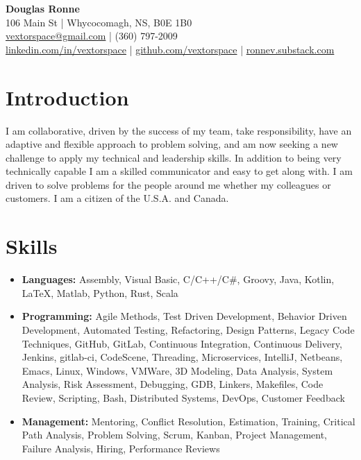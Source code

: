 \documentclass[letter,11pt]{article}
\begin{document}
\begin{center}
    {\Huge \textbf{Douglas Ronne}}\\
    \vspace{2mm}
    106 Main St | Whycocomagh, NS, B0E 1B0\\
    \href{mailto:vextorspace@gmail.com}{vextorspace@gmail.com} | (360) 797-2009\\
    \href{https://www.linkedin.com/in/vextorspace}{linkedin.com/in/vextorspace} | \href{https://github.com/vextorspace}{github.com/vextorspace} | \href{https://ronnev.substack.com}{ronnev.substack.com}
\end{center}

\section*{Introduction}

I am collaborative, driven by the success of my team, take responsibility, have an adaptive and flexible approach to problem solving, and am now seeking a new challenge to apply my technical and leadership skills. In addition to being very technically capable I am a skilled communicator and easy to get along with. I am driven to solve problems for the people around me whether my colleagues or customers. I am a citizen of the U.S.A. and Canada.

\section*{Skills}
\begin{itemize}[leftmargin=*,itemsep=0pt, parsep=0pt,label=$\diamond$]
\item \textbf{Languages:} Assembly, Visual Basic, C/C++/C\#, Groovy, Java, Kotlin, LaTeX, Matlab, Python, Rust, Scala
\item \textbf{Programming:} Agile Methods, Test Driven Development, Behavior Driven Development, Automated Testing, Refactoring, Design Patterns, Legacy Code Techniques, GitHub, GitLab, Continuous Integration, Continuous Delivery, Jenkins, gitlab-ci, CodeScene, Threading, Microservices, IntelliJ, Netbeans, Emacs, Linux, Windows, VMWare, 3D Modeling, Data Analysis, System Analysis, Risk Assessment, Debugging, GDB, Linkers, Makefiles, Code Review, Scripting, Bash, Distributed Systems, DevOps, Customer Feedback
\item \textbf{Management:} Mentoring, Conflict Resolution, Estimation, Training, Critical Path Analysis, Problem Solving, Scrum, Kanban, Project Management, Failure Analysis, Hiring, Performance Reviews
\end{itemize}
\end{document}

